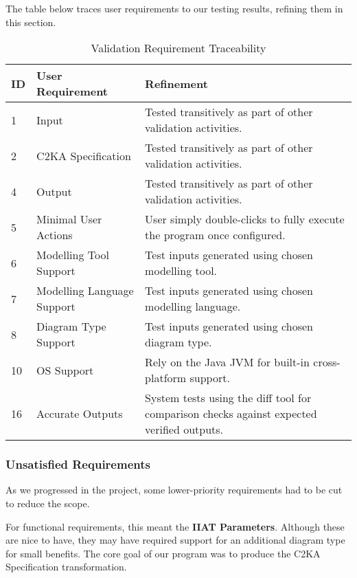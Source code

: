 The table below traces user requirements to our testing results, refining them in this section.
\begin{table}[htbp]
    \centering
    \caption{Validation Requirement Traceability}\label{tab:test-res-table}
    \begin{tabularx}{\textwidth}{| l | l | X |}
        \hline
        \textbf{ID} & \textbf{User Requirement} & \textbf{Refinement} \\
        \hline
        1 & Input & Tested transitively as part of other validation activities. \\ \hline
        2 & C2KA Specification & Tested transitively as part of other validation activities.\\ \hline
        4 & Output & Tested transitively as part of other validation activities.\\ \hline
        5 & Minimal User Actions & User simply double-clicks to fully execute the program once configured.\\ \hline
        6 & Modelling Tool Support & Test inputs generated using chosen modelling tool.\\ \hline
        7 & Modelling Language Support  & Test inputs generated using chosen modelling language.\\ \hline
        8 & Diagram Type Support  & Test inputs generated using chosen diagram type.\\ \hline
        10 & OS Support & Rely on the Java JVM for built-in cross-platform support.\\ \hline
        16 & Accurate Outputs & System tests using the diff tool for comparison checks against expected verified outputs. \\ \hline
    \end{tabularx}
\end{table}

\subsubsection{Unsatisfied Requirements} \label{subsubsec:unsat-reqs}
As we progressed in the project, some lower-priority requirements had to be cut to reduce the scope.

For functional requirements, this meant the \textbf{IIAT Parameters}.
Although these are nice to have, they may have required support for an additional diagram type for small benefits.
The core goal of our program was to produce the C2KA Specification transformation.

